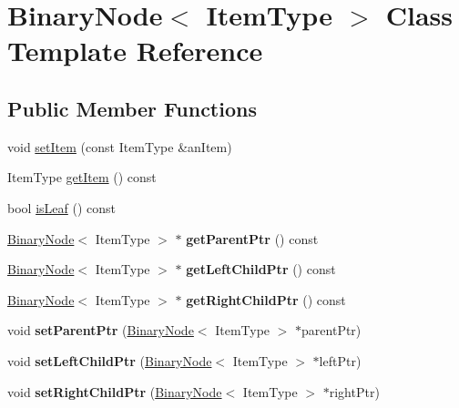 \hypertarget{class_binary_node}{}\section{Binary\+Node$<$ Item\+Type $>$ Class Template Reference}
\label{class_binary_node}
\subsection*{Public Member Functions}
\begin{DoxyCompactItemize}
\item 
void \hyperlink{class_binary_node_ab731c8cf87040e19ecba80f407b4d9b1}{set\+Item} (const Item\+Type \&an\+Item)
\item 
Item\+Type \hyperlink{class_binary_node_a10780d779ff7a9c51473715967a7a439}{get\+Item} () const
\item 
bool \hyperlink{class_binary_node_a837d4805b46040906b8c5a331e73abee}{is\+Leaf} () const
\item 
\hypertarget{class_binary_node_aa6757b8f7b050c4016d15c01bcab805a}{}\label{class_binary_node_aa6757b8f7b050c4016d15c01bcab805a} 
\hyperlink{class_binary_node}{Binary\+Node}$<$ Item\+Type $>$ $\ast$ {\bfseries get\+Parent\+Ptr} () const
\item 
\hypertarget{class_binary_node_acf93048be8864cf90c02dca1106902df}{}\label{class_binary_node_acf93048be8864cf90c02dca1106902df} 
\hyperlink{class_binary_node}{Binary\+Node}$<$ Item\+Type $>$ $\ast$ {\bfseries get\+Left\+Child\+Ptr} () const
\item 
\hypertarget{class_binary_node_ad96f01da47b6786a5f4f384380755c96}{}\label{class_binary_node_ad96f01da47b6786a5f4f384380755c96} 
\hyperlink{class_binary_node}{Binary\+Node}$<$ Item\+Type $>$ $\ast$ {\bfseries get\+Right\+Child\+Ptr} () const
\item 
\hypertarget{class_binary_node_a5df87a46296c99ed99444996ee7bbff6}{}\label{class_binary_node_a5df87a46296c99ed99444996ee7bbff6} 
void {\bfseries set\+Parent\+Ptr} (\hyperlink{class_binary_node}{Binary\+Node}$<$ Item\+Type $>$ $\ast$parent\+Ptr)
\item 
\hypertarget{class_binary_node_aa36a2b61c6b76aeb79465776c80d5c49}{}\label{class_binary_node_aa36a2b61c6b76aeb79465776c80d5c49} 
void {\bfseries set\+Left\+Child\+Ptr} (\hyperlink{class_binary_node}{Binary\+Node}$<$ Item\+Type $>$ $\ast$left\+Ptr)
\item 
\hypertarget{class_binary_node_a2252f471ea06bb2568b6c2af5ece23f6}{}\label{class_binary_node_a2252f471ea06bb2568b6c2af5ece23f6} 
void {\bfseries set\+Right\+Child\+Ptr} (\hyperlink{class_binary_node}{Binary\+Node}$<$ Item\+Type $>$ $\ast$right\+Ptr)
\end{DoxyCompactItemize}
